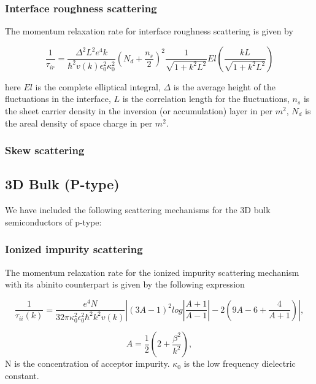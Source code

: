\documentclass[12pt]{article}
\begin{document}
\subsubsection{Interface roughness scattering}
The momentum relaxation rate for interface roughness scattering is given by \cite{goodnick1985surface, ferry2016semiconductor}

\begin{equation}
    \frac{1}{\tau_{ir}} = \frac{\Delta^2 L^2  e^4 k}{\hbar^2 v(k) \epsilon_0^2 \kappa_0^2} \left( N_{d} + \frac{n_s}{2} \right)^2 \frac{1}{\sqrt{1+k^2L^2}} El(\frac{kL}{\sqrt{1+k^2L^2}})
    \label{ir}
\end{equation}

here $El$ is the complete elliptical integral, $\Delta$ is the average height of the fluctuations in the interface, $L$ is the correlation length for the fluctuations, $n_s$ is the sheet carrier density in the inversion (or accumulation) layer in per $m^2$, $N_{d}$ is the areal density of space charge in per $m^2$.
\subsubsection{Skew scattering}


\subsection{3D Bulk (P-type)}
We have included the following scattering mechanisms for the 3D bulk semiconductors of p-type: 

\subsubsection{Ionized impurity scattering}
The momentum relaxation rate for the ionized impurity scattering mechanism with its abinito counterpart is given by the following expression \cite{ramu2011thermoelectric}

\begin{equation}
\frac{1}{\tau_{ii}(k)} = \frac{e^4 N }{32\pi \kappa_0^2 \epsilon_0^2\hbar^2 k^2 v(k)} \left|  (3A-1)^2 log \left|  \frac{A+1}{A-1} \right|  -2 (9A-6+ \frac{4}{A+1}) \right|  ,
\label{Ionized_impurity_p}
\end{equation}

\begin{equation}
A = \frac{1}{2} \left(2 + \frac{\beta^2}{k^2}\right),
\label{A}
\end{equation}
N is the concentration of acceptor impurity. $\kappa_0$ is the low frequency dielectric constant. 
\end{document}
